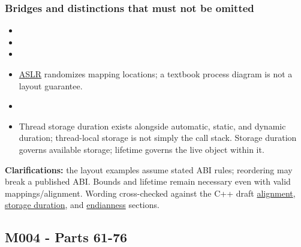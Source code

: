 \subsubsection{Bridges and distinctions that must not be omitted}\label{bridges-and-distinctions-that-must-not-be-omitted}

\begin{itemize}
\tightlist
\item
\item
\item
\item
  \hyperref[appendix-78cb248c8355]{ASLR} randomizes mapping locations; a textbook process diagram is not a layout guarantee.
\item
\item
  Thread storage duration exists alongside automatic, static, and dynamic duration; thread-local storage is not simply the call stack. Storage duration governs available storage; lifetime governs the live object within it.
\end{itemize}

\textbf{Clarifications:} the layout examples assume stated ABI rules; reordering may break a published ABI. Bounds and lifetime remain necessary even with valid mappings/alignment. Wording cross-checked against the C++ draft \href{https://eel.is/c++draft/basic.align}{alignment}, \href{https://eel.is/c++draft/basic.stc}{storage duration}, and \href{https://eel.is/c++draft/bit.endian}{endianness} sections.

\subsection{M004 - Parts 61-76}\label{m004---parts-61-76}

